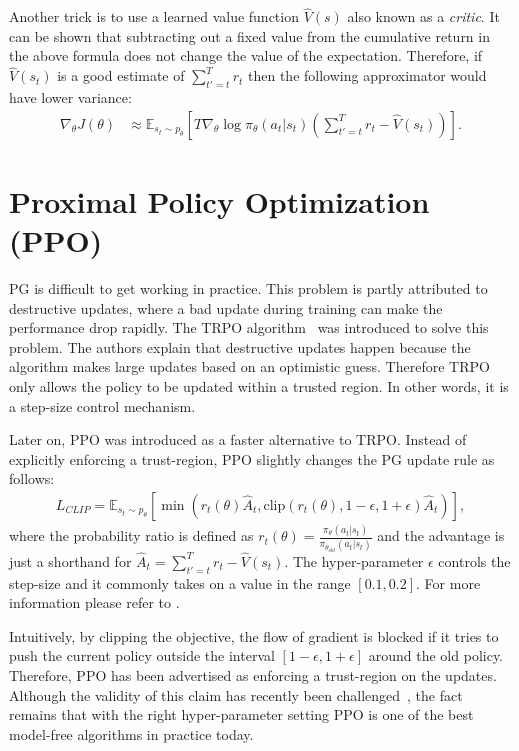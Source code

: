 Another trick is to use a learned value function $\hat{V}(s)$ also known as a \textit{critic}. It can be shown that subtracting out a fixed value from the cumulative return in the above formula does not change the value of the expectation. Therefore, if $\hat{V}(s_t)$ is a good estimate of $\sum_{t'=t}^T r_t$ then the following approximator would have lower variance:
\begin{align}
    \nabla_\theta J(\theta) &\approx \mathbb{E}_{s_t \sim p_\theta} \left[T \nabla_\theta \log \pi_\theta(a_t|s_t) \left( \sum_{t'=t}^T r_t - \hat{V}(s_t) \right) \right].
\end{align}

\section{Proximal Policy Optimization (PPO)}

\ac{PG} is difficult to get working in practice. This problem is partly attributed to destructive updates, where a bad update during training can make the performance drop rapidly.
The \ac{TRPO} algorithm~\cite{trpo} was introduced to solve this problem.
The authors explain that destructive updates happen because the algorithm makes large updates based on an optimistic guess.
Therefore \ac{TRPO} only allows the policy to be updated within a trusted region.
In other words, it is a step-size control mechanism.

Later on, \ac{PPO} was introduced as a faster alternative to \ac{TRPO}. Instead of explicitly enforcing a trust-region, \ac{PPO} slightly changes the \ac{PG} update rule as follows:
\begin{align}
    L_{CLIP} = \mathbb{E}_{s_t \sim p_\theta} \left[ \min \left(r_t(\theta) \hat{A}_t, \text{clip}(r_t(\theta), 1-\epsilon, 1+\epsilon) \hat{A}_t\right) \right],
\end{align}
where the probability ratio is defined as $r_t(\theta) = \frac{\pi_\theta(a_t|s_t)}{\pi_{\theta_{old}}(a_t|s_t)}$ and the advantage is just a shorthand for $\hat{A}_t = \sum_{t'=t}^T r_t - \hat{V}(s_t)$. The hyper-parameter $\epsilon$ controls the step-size and it commonly takes on a value in the range $[0.1,0.2]$. For more information please refer to \cite{ppo}.

Intuitively, by clipping the objective, the flow of gradient is blocked if it tries to push the current policy outside the interval $[1-\epsilon, 1+\epsilon]$ around the old policy. Therefore, \ac{PPO} has been advertised as enforcing a trust-region on the updates.
Although the validity of this claim has recently been challenged~\cite{truly_pg}, the fact remains that with the right hyper-parameter setting \ac{PPO} is one of the best model-free algorithms in practice today.
